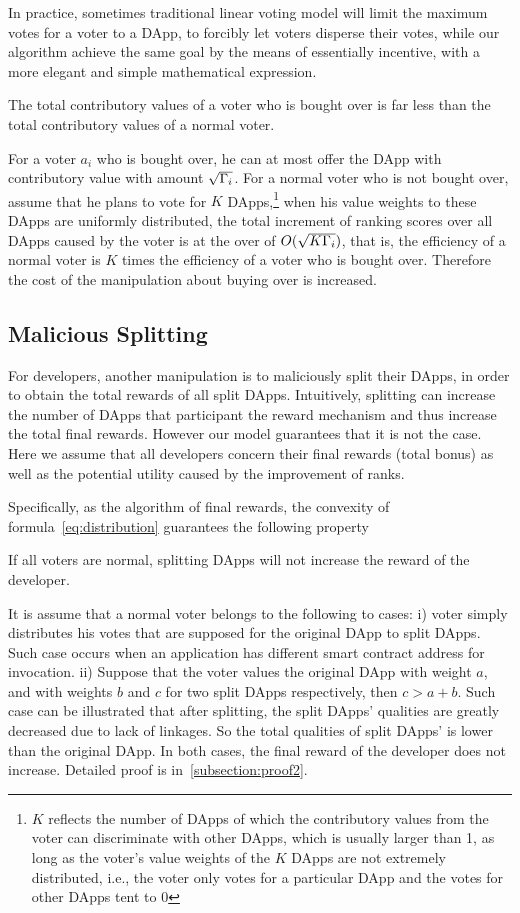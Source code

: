 In practice, sometimes traditional  linear voting model will limit the maximum votes for a voter to a DApp, to forcibly let voters disperse their votes, while our algorithm achieve the same goal by the means of essentially incentive,  with a more elegant and simple mathematical expression.

\begin{corollary}
	The total contributory values of a  voter who is bought over is far less than the total contributory values of a normal voter.
\end{corollary}
For a voter $a_i$ who is bought over, he can at most offer the DApp with contributory value with amount $\sqrt{\Gamma_i}$. For a normal voter who is not bought over, assume that he plans to vote for $K$ DApps,\footnote{$K$ reflects the number of DApps of which the contributory values from the voter can discriminate with other DApps, which is usually larger than 1, as long as the voter's value weights of the $K$ DApps are not extremely distributed, i.e., the voter only votes for a particular DApp and the votes for other DApps tent to 0} when  his value weights to these DApps are uniformly distributed, the total increment of ranking scores  over all DApps caused by the voter is at the over of $O(\sqrt{K\Gamma_i})$, that is, the efficiency of a normal voter is $K$ times the efficiency of a voter who is bought over. Therefore the cost of the manipulation about buying over is increased.

\subsection{Malicious Splitting}
\label{subsec:5.2}
For developers, another manipulation is to maliciously split their DApps, in order to obtain the total rewards of all split DApps. Intuitively, splitting can increase the number of DApps that participant the reward mechanism and thus increase the total final rewards. However our model guarantees that it is not the case. Here we assume that all developers concern their final rewards (total bonus) as well as the potential utility caused by the improvement of ranks.

Specifically, as the algorithm of final rewards, the convexity of formula~\ref{eq:distribution} guarantees the following property
\begin{property}
	\label{p2}
    If all voters are normal, splitting DApps will not increase the reward of the developer.
\end{property}
It is assume that a normal voter belongs to the following to cases: i) voter simply distributes his votes that are supposed for the original DApp to split DApps. Such case occurs when an application has different smart contract address for invocation. ii) Suppose that the voter values the original DApp with weight $a$, and with weights $b$ and $c$ for two split DApps respectively, then $c>a+b$. Such case can be illustrated that after splitting, the split DApps' qualities are greatly decreased due to lack of linkages. So the total qualities of split DApps' is lower than the original DApp. In both cases, the final reward of the developer does not increase. Detailed proof  is in~\ref{subsection:proof2}.


